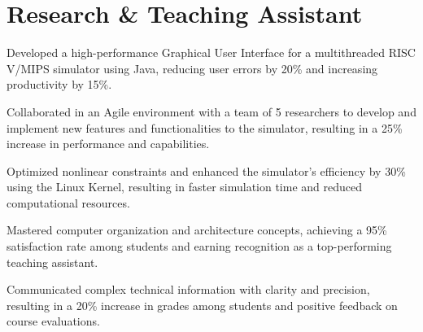 \documentclass[]{deedy-resume-openfont}
\begin{document}
\begin{minipage}[t]{0.66\textwidth}
\section{Research \& Teaching Assistant}
\begin{tightemize}
\item Developed a high-performance Graphical User Interface for a multithreaded RISC V/MIPS simulator using Java, reducing user errors by 20\% and increasing productivity by 15\%.

\item Collaborated in an Agile environment with a team of 5 researchers to develop and implement new features and functionalities to the simulator, resulting in a 25\% increase in performance and capabilities.

\item Optimized nonlinear constraints and enhanced the simulator's efficiency by 30\% using the Linux Kernel, resulting in faster simulation time and reduced computational resources.

\end{tightemize}
\begin{tightemize}
\item Mastered computer organization and architecture concepts, achieving a 95\% satisfaction rate among students and earning recognition as a top-performing teaching assistant.
\item Communicated complex technical information with clarity and precision, resulting in a 20\% increase in grades among students and positive feedback on course evaluations.

\end{tightemize}
\end{minipage} 
\clearpage
\end{document}
